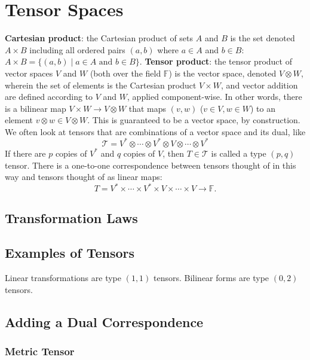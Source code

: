\chapter{Tensor Spaces}
\textbf{Cartesian product}: the Cartesian product of sets $A$ and $B$ is the set denoted $A\times B$ including all ordered pairs $(a, b)$ where $a\in A$ and $b\in B$: $A\times B =\{(a, b) \;|\; a\in A\text{ and } b\in B\}$.
\textbf{Tensor product}: the tensor product of vector spaces $V$ and $W$ (both over the field $\mathbb{F}$) is the vector space, denoted $V\otimes W$, wherein the set of elements is the Cartesian product $V \times W$, and vector addition are defined according to $V$ and $W$, applied component-wise. In other words, there is a bilinear map $V\times W\rightarrow V\otimes W$ that maps $(v, w)$ ($v\in V, w\in W$) to an element $v\otimes w \in V\otimes W$. This is guaranteed to be a vector space, by construction. We often look at tensors that are combinations of a vector space and its dual, like
$$
	\mathcal{T} = V^*\otimes \cdots \otimes V^* \otimes V\otimes \cdots \otimes V^*
$$
If there are $p$ copies of $V^*$ and $q$ copies of $V$, then $T\in\mathcal{T}$ is called a type $(p, q)$ tensor. There is a one-to-one correspondence between tensors thought of in this way and tensors thought of as linear maps:
$$
	T = V^*\times \cdots \times V^* \times V\times\cdots\times V\rightarrow \mathbb{F}.
$$
\section{Transformation Laws}
\section{Examples of Tensors}
Linear transformations are type $(1, 1)$ tensors. Bilinear forms are type $(0, 2)$ tensors.
\section{Adding a Dual Correspondence}
\subsection{Metric Tensor}
